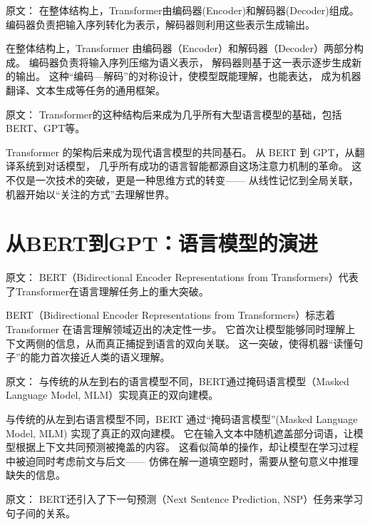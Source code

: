 原文：
在整体结构上，Transformer由编码器(Encoder)和解码器(Decoder)组成。  
编码器负责把输入序列转化为表示，解码器则利用这些表示生成输出。  

在整体结构上，Transformer 由编码器（Encoder）和解码器（Decoder）两部分构成。  
编码器负责将输入序列压缩为语义表示，  
解码器则基于这一表示逐步生成新的输出。  
这种“编码—解码”的对称设计，使模型既能理解，也能表达，  
成为机器翻译、文本生成等任务的通用框架。  



原文：
Transformer的这种结构后来成为几乎所有大型语言模型的基础，包括BERT、GPT等。  

Transformer 的架构后来成为现代语言模型的共同基石。  
从 BERT 到 GPT，从翻译系统到对话模型，  
几乎所有成功的语言智能都源自这场注意力机制的革命。  
这不仅是一次技术的突破，更是一种思维方式的转变——  
从线性记忆到全局关联，机器开始以“关注的方式”去理解世界。  


\section{从BERT到GPT：语言模型的演进}

原文：
BERT（Bidirectional Encoder Representations from Transformers）代表了Transformer在语言理解任务上的重大突破。  

BERT（Bidirectional Encoder Representations from Transformers）标志着 Transformer 在语言理解领域迈出的决定性一步。  
它首次让模型能够同时理解上下文两侧的信息，从而真正捕捉到语言的双向关联。  
这一突破，使得机器“读懂句子”的能力首次接近人类的语义理解。  



原文：
与传统的从左到右的语言模型不同，BERT通过掩码语言模型（Masked Language Model, MLM）实现真正的双向建模。  

与传统的从左到右语言模型不同，BERT 通过“掩码语言模型”(Masked Language Model, MLM) 实现了真正的双向建模。  
它在输入文本中随机遮盖部分词语，让模型根据上下文共同预测被掩盖的内容。  
这看似简单的操作，却让模型在学习过程中被迫同时考虑前文与后文——  
仿佛在解一道填空题时，需要从整句意义中推理缺失的信息。  



原文：
BERT还引入了下一句预测（Next Sentence Prediction, NSP）任务来学习句子间的关系。  

